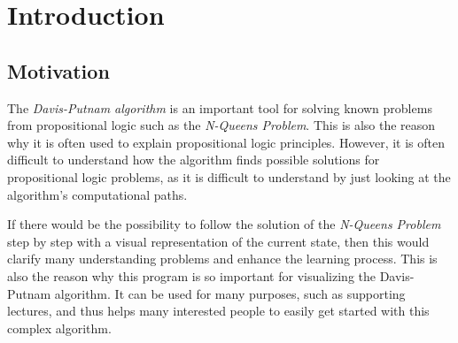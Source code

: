 
\chapter{Introduction}
\label{ch:introduction}

\section{Motivation}
\label{sec:introMotivation}
The \textit{Davis-Putnam algorithm} is an important tool for solving known problems from propositional logic such as the \textit{N-Queens Problem}. This is also the reason why it is often used to explain propositional logic principles. However, it is often difficult to understand how the algorithm finds possible solutions for propositional logic problems, as it is difficult to understand by just looking at the algorithm's computational paths.

If there would be the possibility to follow the solution of the \textit{N-Queens Problem} step by step with a visual representation of the current state, then this would clarify many understanding problems and enhance the learning process. This is also the reason why this program is so important for visualizing the Davis-Putnam algorithm. It can be used for many purposes, such as supporting lectures, and thus helps many interested people to easily get started with this complex algorithm.

